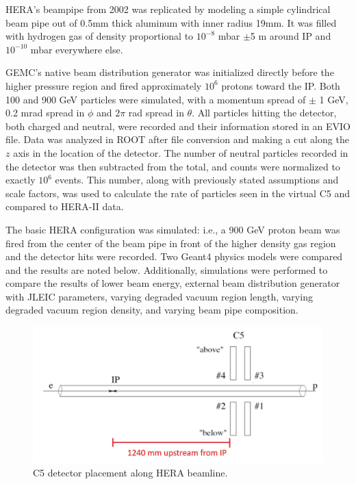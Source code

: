 HERA's beampipe from 2002 was replicated by modeling a simple cylindrical beam pipe out of 0.5mm thick aluminum with inner radius 19mm.  It was filled with hydrogen gas of density proportional to  $10^{-8}$ mbar $\pm$5 m around IP and $10^{-10}$ mbar everywhere else\cite{ZEUS:1993}.

GEMC's native beam distribution generator was initialized directly before the higher pressure region and fired approximately $10^6$ protons toward the IP.  Both 100 and 900 GeV particles were simulated, with a momentum spread of $\pm$ 1 GeV, 0.2 mrad spread in $\phi$ and $2\pi$ rad spread in $\theta$.  All particles hitting the detector, both charged and neutral, were recorded and their information stored in an EVIO file.  Data was analyzed in ROOT after file conversion and making a cut along the $z$ axis in the location of the detector.  The number of neutral particles recorded in the detector was then subtracted from the total, and counts were normalized to exactly $10^6$ events.  This number, along with previously stated assumptions and scale factors, was used to calculate the rate of particles seen in the virtual C5 and compared to HERA-II data\cite{Furletova:2015pma}.

The basic HERA configuration was simulated: i.e., a 900 GeV proton beam was fired from the center of the beam pipe in front of the higher density gas region and the detector hits were recorded.  Two Geant4 physics models were compared and the results are noted below.  Additionally, simulations were performed to compare the results of lower beam energy, external beam distribution generator with JLEIC parameters, varying degraded vacuum region length, varying degraded vacuum region density, and varying beam pipe composition.

\begin{figure}[!hbt]
	\centering
	\includegraphics[width=.75\textwidth]{../../img/c5_placement.jpg}
	\caption{C5 detector placement along HERA beamline.}
	\label{fig:hera4}
\end{figure}

